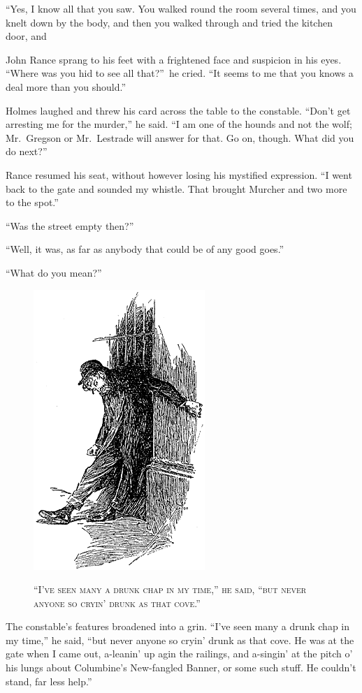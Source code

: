 \documentclass[12pt,english]{book}
\newcommand{\noun}[1]{\textsc{#1}}
\begin{document}
{}``Yes, I know all that you saw. You walked round the room several
times, and you knelt down by the body, and then you walked through
and tried the kitchen door, and 

John Rance sprang to his feet with a frightened face and suspicion
in his eyes. {}``Where was you hid to see all that?''\ he cried.
{}``It seems to me that you knows a deal more than you should.''

Holmes laughed and threw his card across the table to the constable.
{}``Don't get arresting me for the murder,'' he said. {}``I am
one of the hounds and not the wolf; Mr.\ Gregson or Mr.\ Lestrade
will answer for that. Go on, though. What did you do next?''

Rance resumed his seat, without however losing his mystified expression.
{}``I went back to the gate and sounded my whistle. That brought
Murcher and two more to the spot.''

{}``Was the street empty then?''

{}``Well, it was, as far as anybody that could be of any good goes.''

{}``What do you mean?''

%
\begin{figure}[htbp]
\noindent \begin{center}\includegraphics{images/study10-stud-08.png}\end{center}

\noindent \begin{center}\noun{{}``I've seen many a drunk chap in
my time,'' he said, {}``but never anyone so cryin' drunk as that
cove.''}\end{center}
\end{figure}
The constable's features broadened into a grin. {}``I've seen many
a drunk chap in my time,'' he said, {}``but never anyone so cryin'
drunk as that cove. He was at the gate when I came out, a-leanin'
up agin the railings, and a-singin' at the pitch o' his lungs about
Columbine's New-fangled Banner, or some such stuff. He couldn't stand,
far less help.''
\end{document}
